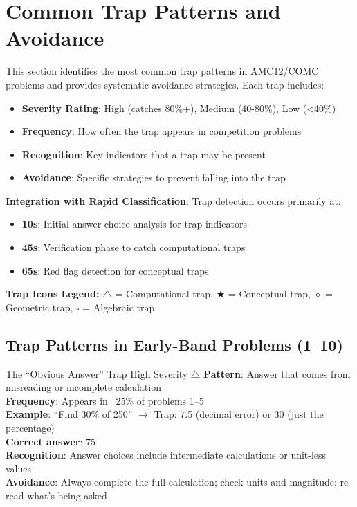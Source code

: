 \documentclass{article}
\begin{document}
\section{Common Trap Patterns and Avoidance}

\begin{tcolorbox}[colback=yellow!10!white,colframe=orange!75!black,title={\textbf{Section Overview: Trap Pattern Recognition}}]
This section identifies the most common trap patterns in AMC12/COMC problems and provides systematic avoidance strategies. Each trap includes:
\begin{itemize}[nosep]
\item \textbf{Severity Rating}: \colorbox{red!20}{High} (catches 80\%+), \colorbox{orange!20}{Medium} (40-80\%), \colorbox{yellow!20}{Low} (<40\%)
\item \textbf{Frequency}: How often the trap appears in competition problems
\item \textbf{Recognition}: Key indicators that a trap may be present
\item \textbf{Avoidance}: Specific strategies to prevent falling into the trap
\end{itemize}

\textbf{Integration with Rapid Classification}: Trap detection occurs primarily at:
\begin{itemize}[nosep]
\item \textbf{10s}: Initial answer choice analysis for trap indicators
\item \textbf{45s}: Verification phase to catch computational traps
\item \textbf{65s}: Red flag detection for conceptual traps
\end{itemize}

\textbf{Trap Icons Legend:}
$\triangle$ = Computational trap, $\bigstar$ = Conceptual trap, $\diamond$ = Geometric trap, $\square$ = Algebraic trap
\end{tcolorbox}

\subsection{Trap Patterns in Early-Band Problems (1--10)}

\begin{trapbox}{The ``Obvious Answer'' Trap \colorbox{red!20}{High Severity} $\triangle$}
\textbf{Pattern}: Answer that comes from misreading or incomplete calculation\\
\textbf{Frequency}: Appears in ~25\% of problems 1--5\\
\textbf{Example}: ``Find 30\% of 250'' $\rightarrow$ Trap: 7.5 (decimal error) or 30 (just the percentage)\\
\textbf{Correct answer}: 75\\
\textbf{Recognition}: Answer choices include intermediate calculations or unit-less values\\
\textbf{Avoidance}: Always complete the full calculation; check units and magnitude; re-read what's being asked
\end{trapbox}
\end{document}
